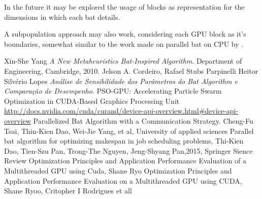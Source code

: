 \documentclass[conference]{IEEEtran}
\begin{document}
In the future it may be explored the usage of blocks as representation
for the dimensions in which each bat details.

A subpopulation approach may also work, considering each GPU block as
it's boundaries, somewhat similar to the work made on parallel bat on
CPU by \cite{paralellCPU}.

\begin{thebibliography}{1}
    Xin-She Yang \emph{A New Metaheuristics Bat-Inspired Algorithm}. Department of Engineering, Cambridge, 2010.
    Jelson A. Cordeiro, Rafael Stubs Parpinelli Heitor Silvério Lopes \emph{Análise de Sensibilidade dos Parâmetros do Bat Algorithm e Comparação de Desempenho}.
    PSO-GPU: Accelerating Particle Swarm Optimization in CUDA-Based Graphics Processing Unit
    \url{http://docs.nvidia.com/cuda/curand/device-api-overview.html#device-api-overview}
    Parallelized Bat Algorithm with a Communication Strategy. Cheng-Fu Tsai, Thin-Kien Dao, Wei-Jie Yang, et al, University of applied sciences
    Parallel bat algorithm for optimizing makespan in job scheduling problems, Thi-Kien Dao, Tien-Szu Pan, Trong-The Nguyen, Jeng-Shyang Pan,2015, Springer Sience Review
    Optimization Principles and Application Performance Evaluation of a Multithreaded GPU using Cuda, Shane Ryo
    Optimization Principles and Application Performance Evaluation on a Multithreaded GPU using CUDA, Shane Ryoo, Critopher I Rodrigues et all

\end{thebibliography}
\end{document}
